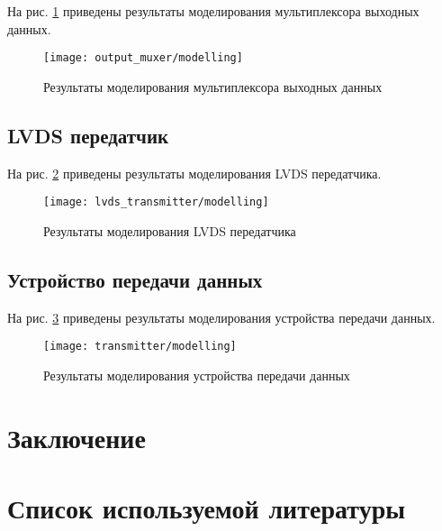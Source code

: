 На рис. \ref{fig:output_muxer_modelling} приведены результаты моделирования мультиплексора выходных данных.
\begin{figure}[H]
	\centering
	\texttt{[image: output\_muxer/modelling]}
	\caption{Результаты моделирования мультиплексора выходных данных}
	\label{fig:output_muxer_modelling}
\end{figure}

\subsection{LVDS передатчик}

На рис. \ref{fig:lvds_transmitter_modelling} приведены результаты моделирования LVDS передатчика.
\begin{figure}[H]
	\centering
	\texttt{[image: lvds\_transmitter/modelling]}
	\caption{Результаты моделирования LVDS передатчика}
	\label{fig:lvds_transmitter_modelling}
\end{figure}

\subsection{Устройство передачи данных}

На рис. \ref{fig:transmitter_modelling} приведены результаты моделирования устройства передачи данных.
\begin{figure}[H]
	\centering
	\texttt{[image: transmitter/modelling]}
	\caption{Результаты моделирования устройства передачи данных}
	\label{fig:transmitter_modelling}
\end{figure}

\newpage

\section*{Заключение}

\newpage

\section*{Список используемой литературы}

